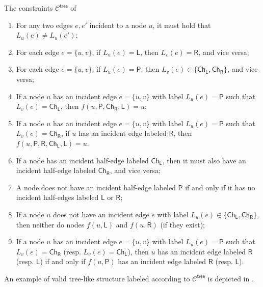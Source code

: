 \documentclass[11pt]{article}
\newcommand{\lparent}{\mathsf {P}}
\newcommand{\lleft}{\mathsf {L}}
\newcommand{\lright}{\mathsf {R}}
\newcommand{\llch}{\ensuremath{\mathsf {Ch_L}}}
\newcommand{\lrch}{\ensuremath{\mathsf {Ch_R}}}
\newcommand{\ltreelike}{\mathsf {tree}}
\begin{document}
\begin{myframe}{The constraints $\mathcal{C}^{\ltreelike}$ of \cite{congest-lcls}}
	\begin{enumerate}
		\item For any two edges $e,e'$ incident to a node $u$, it must hold that $L_u(e)\neq L_u(e')$;\label{cons-tree:differentEdgeLabels}
		
		\item For each edge $e=\{u,v\}$, if $L_u(e)=\lleft$, then $L_v(e)=\lright$, and vice versa; \label{cons-tree:left-right}
		
		\item For each edge $e=\{u,v\}$, if $L_u(e)=\lparent$, then $L_v(e)\in\{\llch,\lrch\}$, and vice versa;\label{cons-tree:parent-child}
		
		\item If a node $u$ has an incident edge $e=\{u,v\}$ with label $L_u(e)=\lparent$ such that $L_v(e)=\llch$, then $f(u, \lparent,\lrch,\lleft)=u$;\label{cons-tree:triangle}
		
		\item If a node $u$ has an incident edge $e=\{u,v\}$ with label $L_u(e)=\lparent$ such that $L_v(e)=\lrch$, if $u$ has an incident edge labeled $\lright$, then $f(u, \lparent,\lright,\llch,\lleft)=u$.\label{cons-tree:square}
		
		\item If a node has an incident half-edge labeled $\llch$, then it must also have an incident half-edge labeled $\lrch$, and vice versa;\label{cons-tree:2children}
		
		\item A node does not have an incident half-edge labeled $\lparent$ if and only if it has no incident half-edges labeled $\lleft$ or $\lright$; \label{cons-tree:root}
		
		\item If a node $u$ does not have an incident edge $e$ with label $L_u(e)\in\{\llch, \lrch\}$, then neither do nodes $f(u,\lleft)$ and $f(u,\lright)$ (if they exist);\label{cons-tree:boundarychildren}
		
		\item If a node $u$ has an incident edge $e=\{u,v\}$ with label $L_u(e)=\lparent$ such that $L_v(e)=\lrch$ (resp. $L_v(e)=\llch$), then $u$ has an incident edge labeled $\lright$ (resp. $\lleft$) if and only if $f(u,\lparent)$ has an incident edge labeled $\lright$ (resp. $\lleft$).\label{cons-tree:boundarylr}
		
	\end{enumerate}
\end{myframe}
\noindent An example of valid tree-like structure labeled according to $\mathcal{C}^{\ltreelike}$ is depicted in .
\end{document}

